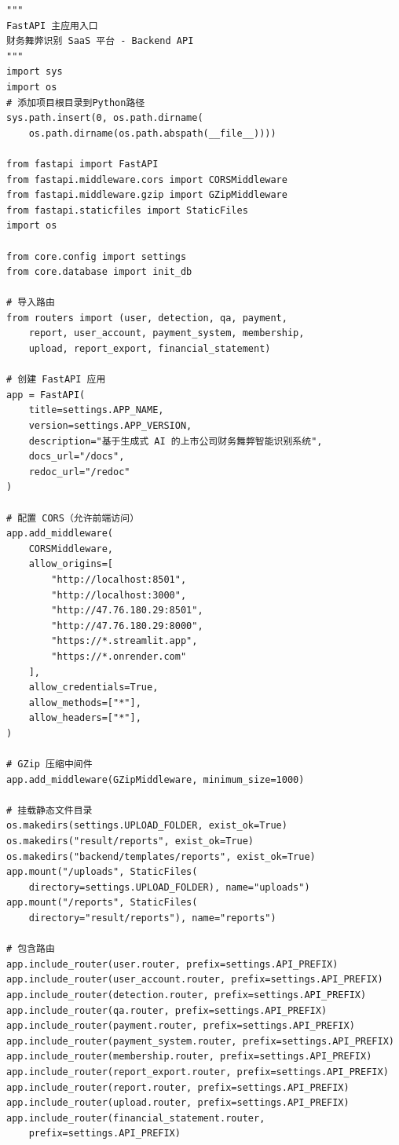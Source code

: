 \documentclass[a4paper,10pt]{article}
\begin{document}
\setcounter{page}{1}

\begin{lstlisting}
"""
FastAPI 主应用入口
财务舞弊识别 SaaS 平台 - Backend API
"""
import sys
import os
# 添加项目根目录到Python路径
sys.path.insert(0, os.path.dirname(
    os.path.dirname(os.path.abspath(__file__))))

from fastapi import FastAPI
from fastapi.middleware.cors import CORSMiddleware
from fastapi.middleware.gzip import GZipMiddleware
from fastapi.staticfiles import StaticFiles
import os

from core.config import settings
from core.database import init_db

# 导入路由
from routers import (user, detection, qa, payment,
    report, user_account, payment_system, membership,
    upload, report_export, financial_statement)

# 创建 FastAPI 应用
app = FastAPI(
    title=settings.APP_NAME,
    version=settings.APP_VERSION,
    description="基于生成式 AI 的上市公司财务舞弊智能识别系统",
    docs_url="/docs",
    redoc_url="/redoc"
)

# 配置 CORS（允许前端访问）
app.add_middleware(
    CORSMiddleware,
    allow_origins=[
        "http://localhost:8501",
        "http://localhost:3000",
        "http://47.76.180.29:8501",
        "http://47.76.180.29:8000",
        "https://*.streamlit.app",
        "https://*.onrender.com"
    ],
    allow_credentials=True,
    allow_methods=["*"],
    allow_headers=["*"],
)

# GZip 压缩中间件
app.add_middleware(GZipMiddleware, minimum_size=1000)

# 挂载静态文件目录
os.makedirs(settings.UPLOAD_FOLDER, exist_ok=True)
os.makedirs("result/reports", exist_ok=True)
os.makedirs("backend/templates/reports", exist_ok=True)
app.mount("/uploads", StaticFiles(
    directory=settings.UPLOAD_FOLDER), name="uploads")
app.mount("/reports", StaticFiles(
    directory="result/reports"), name="reports")

# 包含路由
app.include_router(user.router, prefix=settings.API_PREFIX)
app.include_router(user_account.router, prefix=settings.API_PREFIX)
app.include_router(detection.router, prefix=settings.API_PREFIX)
app.include_router(qa.router, prefix=settings.API_PREFIX)
app.include_router(payment.router, prefix=settings.API_PREFIX)
app.include_router(payment_system.router, prefix=settings.API_PREFIX)
app.include_router(membership.router, prefix=settings.API_PREFIX)
app.include_router(report_export.router, prefix=settings.API_PREFIX)
app.include_router(report.router, prefix=settings.API_PREFIX)
app.include_router(upload.router, prefix=settings.API_PREFIX)
app.include_router(financial_statement.router,
    prefix=settings.API_PREFIX)


\end{lstlisting}
\end{document}
